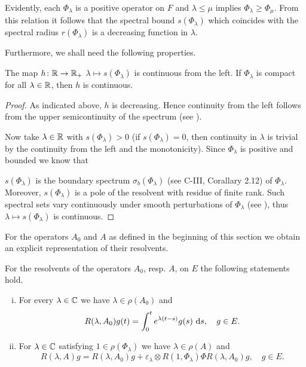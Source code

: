 Evidently, each $\Phi_\lambda$ is a positive operator on $F$ and $\lambda \leq \mu$ implies $\Phi_{\lambda} \geq \Phi_{\mu}$.
From this relation it follows that the spectral bound $s(\Phi_{\lambda})$ which coincides with the spectral radius $r(\Phi_{\lambda})$ is a decreasing function in $\lambda$.

Furthermore, we shall need the following properties.

\begin{lemma}\label{lem:c4-3.4}
The map $h \colon \mathbb{R} \to \mathbb{R}_{+}$ $\lambda \mapsto s(\Phi_{\lambda})$ is continuous from the left. If $\Phi_{\lambda}$ is compact for all $\lambda \in \mathbb{R}$, then $h$ is continuous.
\end{lemma}

\begin{proof}
As indicated above, $h$ is decreasing. Hence continuity from the left follows from the upper semicontinuity of the spectrum (see \citet[Chapter IV, Theorem~3.1]{kato:1976}).

Now take $\lambda \in \mathbb{R}$ with $s(\Phi_{\lambda}) > 0$ (if $s( \Phi_{\lambda}) = 0$, then continuity in $\lambda$ is trivial by the continuity from the left and the monotonicity). Since $\Phi_{\lambda}$ is positive and bounded we know that


$s(\Phi_{\lambda})$ is the boundary spectrum $\sigma_b(\Phi_{\lambda})$ (see C-III, Corallary 2.12) of $\Phi_{\lambda}$. Moreover, $s(\Phi_{\lambda})$ is a pole of the resolvent with residue of finite rank. Such spectral sets vary continuously under smooth perturbations of $\Phi_{\lambda}$ (see \citet[VII.6, Theorem 9]{dunfordschwartz:1958}), thus $\lambda \mapsto s(\Phi_{\lambda})$ is continuous.
\end{proof}

For the operators $A_{0}$ and $A$ as defined in the beginning of this section we obtain an explicit representation of their resolvents.

\begin{lemma}\label{lem:c4-3.5}
For the resolvents of the operators $A_{0}$, resp. $A$, on $E$ the following statements hold.
\begin{enumerate}[(i)]
\item \label{lem:c4-3.5-1}
For every $\lambda \in \mathbb{C}$ we have $\lambda \in \rho(A_{0})$ and
\begin{equation}\label{eq:c4-3.7}
R(\lambda,A_{0})g(t) = \int_{0}^{t} e^{\lambda(t-s)}g(s)\, \mathop{}\!\mathrm{d}{s}, \quad g \in E.
\end{equation}
\item \label{lem:c4-3.5-2}
For $\lambda \in \mathbb{C}$ satisfying $1 \in \rho(\Phi_{\lambda})$ we have $\lambda \in \rho(A)$ and
\begin{equation}\label{eq:c4-3.8}
R(\lambda,A)g = R(\lambda,A_{0})g + \varepsilon_{\lambda} \otimes R(1,\Phi_{\lambda})\Phi R(\lambda,A_{0})g, \quad g \in E.
\end{equation}
\end{enumerate}
\end{lemma}

